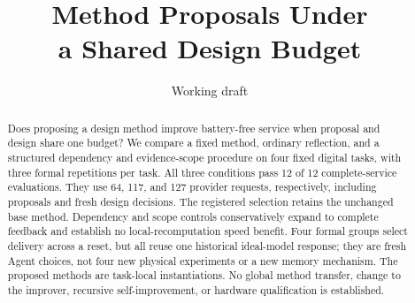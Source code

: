 \documentclass[10pt]{article}
\title{Method Proposals Under\\a Shared Design Budget}
\author{Working draft}
\date{}
\begin{document}
\maketitle
\begin{abstract}
Does proposing a design method improve battery-free service when proposal and
design share one budget? We compare a fixed method, ordinary reflection, and a
structured dependency and evidence-scope procedure on four fixed digital tasks,
with three formal repetitions per task. All three conditions pass 12 of 12
complete-service evaluations. They use 64, 117, and 127 provider requests,
respectively, including proposals and fresh design decisions. The registered
selection retains the unchanged base method. Dependency and scope controls
conservatively expand to complete feedback and establish no local-recomputation
speed benefit. Four formal groups select delivery across a reset, but all reuse
one historical ideal-model response; they are fresh Agent choices, not four
new physical experiments or a new memory mechanism. The proposed methods are
task-local instantiations. No global method transfer, change to the improver,
recursive self-improvement, or hardware qualification is established.
\end{abstract}

\end{document}
